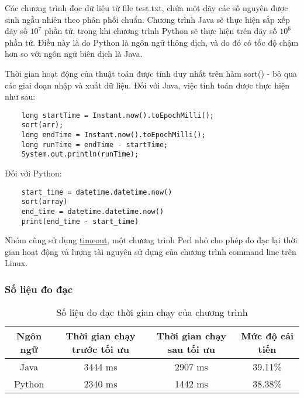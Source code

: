 \documentclass{article}
\begin{document}
    Các chương trình đọc dữ liệu từ file test.txt, chứa một dãy các số
    nguyên được sinh ngẫu nhiên theo phân phối chuẩn. Chương 
    trình Java sẽ thực hiện sắp xếp dãy số $10^7$ phần tử, trong khi 
    chương trình Python sẽ thực hiện trên dãy số $10^6$ phần tử. Điều
    này là do Python là ngôn ngữ thông dịch, và do đó có tốc độ chậm hơn so
    với ngôn ngữ biên dịch là Java.

    Thời gian hoạt động của thuật toán được tính duy nhất trên hàm sort() -
    bỏ qua các giai đoạn nhập và xuất dữ liệu. Đối với Java, việc tính toán
    được thực hiện như sau:

    \begin{lstlisting}
    long startTime = Instant.now().toEpochMilli();
    sort(arr);
    long endTime = Instant.now().toEpochMilli();
    long runTime = endTime - startTime;
    System.out.println(runTime);    
    \end{lstlisting}

    Đối với Python:

    \begin{lstlisting}
    start_time = datetime.datetime.now()
    sort(array)
    end_time = datetime.datetime.now()
    print(end_time - start_time)
    \end{lstlisting}

    Nhóm cũng sử dụng \href{https://github.com/pshved/timeout}{timeout},
    một chương trình Perl nhỏ cho phép đo đạc lại thời gian hoạt động và 
    lượng tài nguyên sử dụng của chương trình command line trên Linux.

    \subsubsection{Số liệu đo đạc}

    \begin{table}[ht]
        \begin{center}
        \begin{adjustbox}{width=\textwidth}
            \begin{tabular}{|c|c|c|c|}
                \hline
                Ngôn ngữ & Thời gian chạy trước tối ưu & Thời gian chạy sau tối ưu & Mức độ cải tiến \\
                \hline
                Java & 3444 ms & 2907 ms & 39.11\% \\
                Python & 2340 ms & 1442 ms & 38.38\% \\
                \hline
            \end{tabular}
        \end{adjustbox}
        \end{center}
        \caption{Số liệu đo đạc thời gian chạy của chương trình}
    \end{table}
\end{document}
